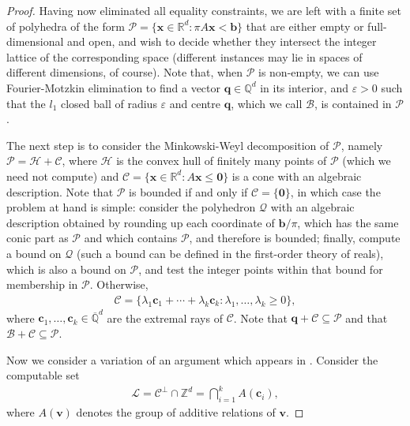 \begin{proof}
Having now eliminated all equality constraints, we are left with a finite set of polyhedra of the form $\mathcal{P} = \lbrace \boldsymbol{x} \in \mathbb{R}^{d}: \pi A \boldsymbol{x} < \boldsymbol{b} \rbrace$ that are either empty or full-dimensional and open, and wish to decide whether they intersect the integer lattice of the corresponding space (different instances may lie in spaces of different dimensions, of course). Note that, when $\mathcal{P}$ is non-empty, we can use Fourier-Motzkin elimination to find a vector $\boldsymbol{q} \in \mathbb{Q}^{d}$ in its interior, and $\varepsilon > 0$ such that the $l_{1}$ closed ball of radius $\varepsilon$ and centre $\boldsymbol{q}$, which we call $\mathcal{B}$, is contained in $\mathcal{P}$.

The next step is to consider the Minkowski-Weyl decomposition of $\mathcal{P}$, namely $\mathcal{P} = \mathcal{H} + \mathcal{C}$, where $\mathcal{H}$ is the convex hull of finitely many points of $\mathcal{P}$ (which we need not compute) and $\mathcal{C} = \lbrace \boldsymbol{x} \in \mathbb{R}^{d}: A \boldsymbol{x} \leq \boldsymbol{0} \rbrace$ is a cone with an algebraic description. Note that $\mathcal{P}$ is bounded if and only if $\mathcal{C} = \lbrace \boldsymbol{0} \rbrace$, in which case the problem at hand is simple: consider the polyhedron $\mathcal{Q}$ with an algebraic description obtained by rounding up each coordinate of $\boldsymbol{b} / \pi$, which has the same conic part as $\mathcal{P}$ and which contains $\mathcal{P}$, and therefore is bounded; finally, compute a bound on $\mathcal{Q}$ (such a bound can be defined in the first-order theory of reals), which is also a bound on $\mathcal{P}$, and test the integer points within that bound for membership in $\mathcal{P}$. Otherwise,
\begin{align*}
\mathcal{C} = \lbrace \lambda_{1} \boldsymbol{c}_{1} + \cdots + \lambda_{k} \boldsymbol{c}_{k}: \lambda_{1}, \ldots, \lambda_{k} \geq 0 \rbrace,
\end{align*}
where $\boldsymbol{c}_{1}, \ldots, \boldsymbol{c}_{k} \in \overline{\mathbb{Q}}^{d}$ are the extremal rays of $\mathcal{C}$. Note that $\boldsymbol{q} + \mathcal{C} \subseteq \mathcal{P}$ and that $\mathcal{B} + \mathcal{C} \subseteq \mathcal{P}$.

Now we consider a variation of an argument which appears in \cite{KP}. Consider the computable set
\begin{align*}
\mathcal{L} = \mathcal{C}^{\perp} \cap \mathbb{Z}^{d} = \bigcap\limits_{i=1}^{k} A(\boldsymbol{c}_{i}) ,
\end{align*}
where $A(\boldsymbol{v})$ denotes the group of additive relations of $\boldsymbol{v}$.


\end{proof}
